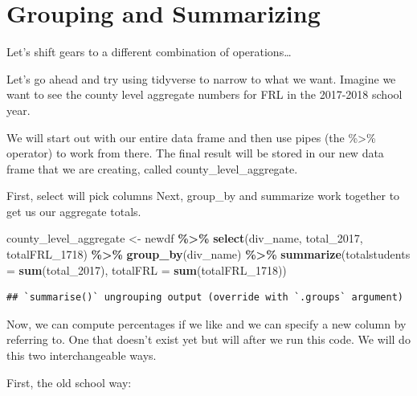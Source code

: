 \documentclass[
]{book}
\newenvironment{Shaded}{\begin{snugshade}}{\end{snugshade}}
\newcommand{\DataTypeTok}[1]{\textcolor[rgb]{0.13,0.29,0.53}{#1}}
\newcommand{\DecValTok}[1]{\textcolor[rgb]{0.00,0.00,0.81}{#1}}
\newcommand{\KeywordTok}[1]{\textcolor[rgb]{0.13,0.29,0.53}{\textbf{#1}}}
\newcommand{\NormalTok}[1]{#1}
\newcommand{\OperatorTok}[1]{\textcolor[rgb]{0.81,0.36,0.00}{\textbf{#1}}}
\newcommand{\StringTok}[1]{\textcolor[rgb]{0.31,0.60,0.02}{#1}}
\begin{document}
\hypertarget{grouping-and-summarizing}{%
\section{Grouping and Summarizing}\label{grouping-and-summarizing}}

Let's shift gears to a different combination of operations\ldots{}

Let's go ahead and try using tidyverse to narrow to what we want.
Imagine we want to see the county level aggregate numbers for FRL in the 2017-2018 school year.

We will start out with our entire data frame and then use pipes (the \%\textgreater\% operator) to work from there.
The final result will be stored in our new data frame that we are creating, called county\_level\_aggregate.

First, select will pick columns
Next, group\_by and summarize work together to get us our aggregate totals.

\begin{Shaded}
\begin{Highlighting}[]
\NormalTok{county\_level\_aggregate \textless{}{-}}\StringTok{ }\NormalTok{newdf }\OperatorTok{\%\textgreater{}\%}\StringTok{ }
\StringTok{  }\KeywordTok{select}\NormalTok{(div\_name, total\_}\DecValTok{2017}\NormalTok{, totalFRL\_}\DecValTok{1718}\NormalTok{) }\OperatorTok{\%\textgreater{}\%}
\StringTok{  }\KeywordTok{group\_by}\NormalTok{(div\_name) }\OperatorTok{\%\textgreater{}\%}
\StringTok{  }\KeywordTok{summarize}\NormalTok{(}\DataTypeTok{totalstudents =} \KeywordTok{sum}\NormalTok{(total\_}\DecValTok{2017}\NormalTok{), }
            \DataTypeTok{totalFRL =} \KeywordTok{sum}\NormalTok{(totalFRL\_}\DecValTok{1718}\NormalTok{))}
\end{Highlighting}
\end{Shaded}

\begin{verbatim}
## `summarise()` ungrouping output (override with `.groups` argument)
\end{verbatim}

Now, we can compute percentages if we like and we can specify a new column by referring to. One that doesn't exist yet but will after we run this code. We will do this two interchangeable ways.

First, the old school way:

\begin{Shaded}
\end{Shaded}
\end{document}
